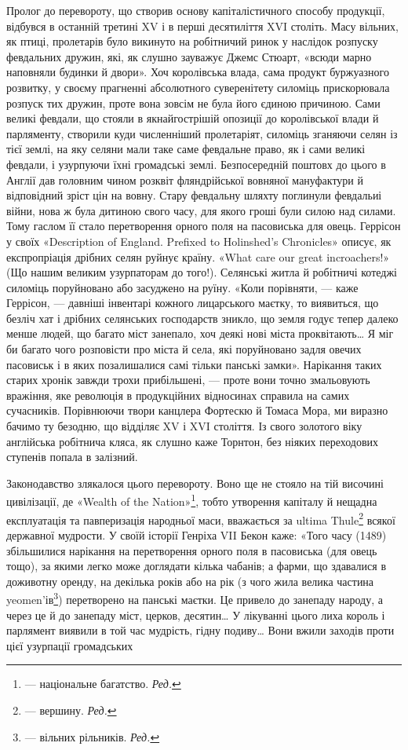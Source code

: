 Пролог до перевороту, що створив основу капіталістичного
способу продукції, відбувся в останній третині XV і в перші
десятиліття XVI століть. Масу вільних, як птиці, пролетарів
було викинуто на робітничий ринок у наслідок розпуску февдальних
дружин, які, як слушно зауважує Джемс Стюарт, «всюди
марно наповняли будинки й двори». Хоч королівська влада,
сама продукт буржуазного розвитку, у своєму прагненні абсолютного
суверенітету силоміць прискорювала розпуск тих дружин,
проте вона зовсім не була його єдиною причиною. Сами
великі февдали, що стояли в якнайгострішій опозиції до королівської
влади й парляменту, створили куди численніший пролетаріят,
силоміць зганяючи селян із тієї землі, на яку селяни
мали таке саме февдальне право, як і сами великі февдали, і
узурпуючи їхні громадські землі. Безпосередній поштовх до цього
в Англії дав головним чином розквіт фляндрійської вовняної
мануфактури й відповідний зріст цін на вовну. Стару февдальну
шляхту поглинули февдальиі війни, нова ж була дитиною свого
часу, для якого гроші були силою над силами. Тому гаслом її
стало перетворення орного поля на пасовиська для овець. Геррісон
у своїх «Description of England. Prefixed to Holinshed’s
Chronicles» описує, як експропріація дрібних селян руйнує
країну. «What care our great incroachers!» (Що нашим великим
узурпаторам до того!). Селянські житла й робітничі котеджі
силоміць поруйновано або засуджено на руїну. «Коли порівняти, —
каже Геррісон, — давніші інвентарі кожного лицарського маєтку,
то виявиться, що безліч хат і дрібних селянських господарств
зникло, що земля годує тепер далеко менше людей, що багато
міст занепало, хоч деякі нові міста проквітають\dots{} Я міг би багато
чого розповісти про міста й села, які поруйновано задля
овечих пасовиськ і в яких позалишалися самі тільки панські
замки». Нарікання таких старих хронік завжди трохи прибільшені,
— проте вони точно змальовують вражіння, яке революція
в продукційних відносинах справила на самих сучасників.
Порівнюючи твори канцлера Фортескю й Томаса Мора, ми виразно
бачимо ту безодню, що відділяє XV і XVI століття. Із свого
золотого віку англійська робітнича кляса, як слушно каже Торнтон,
без ніяких переходових ступенів попала в залізний.

Законодавство злякалося цього перевороту. Воно ще не
стояло на тій височині цивілізації, де «Wealth of the Nation»\footnote*{
— національне багатство. \emph{Ред.}
},
тобто утворення капіталу й нещадна експлуатація та павперизація
народньої маси, вважається за ultima Thule\footnote*{
— вершину. \emph{Ред.}
} всякої державної
мудрости. У своїй історії Генріха VII Бекон каже: «Того
часу (1489) збільшилися нарікання на перетворення орного поля
в пасовиська (для овець тощо), за якими легко може доглядати
кілька чабанів; а фарми, що здавалися в доживотну оренду, на декілька
років або на рік (з чого жила велика частина yeomen’ів\footnote*{
— вільних рільників. \emph{Ред.}
})
перетворено на панські маєтки. Це привело до занепаду народу,
а через це й до занепаду міст, церков, десятин\dots{} У лікуванні
цього лиха король і парлямент виявили в той час мудрість, гідну
подиву\dots{} Вони вжили заходів проти цієї узурпації громадських
\parbreak{}  %
